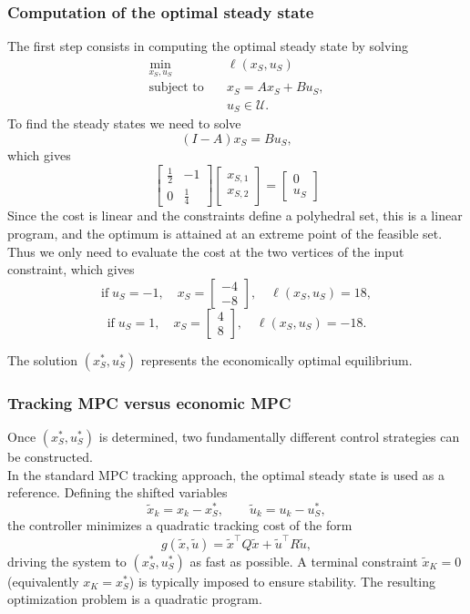 \subsubsection{Computation of the optimal steady state}
The first step consists in computing the optimal steady state by solving
\[
\begin{aligned}
\min_{x_S,u_S} \quad & \ell(x_S,u_S) \\
\text{subject to} \quad & x_S = A x_S + B u_S, \\
& u_S \in \mathcal{U}.
\end{aligned}
\]
To find the steady states we need to solve
\[
(I - A )x_S = B u_S,
\]
which gives
\[
\begin{bmatrix}
    \frac{1}{2} & -1 \\
    0 & \frac{1}{4}
\end{bmatrix}
\begin{bmatrix}
x_{S,1} \\ x_{S,2}
\end{bmatrix}
= \begin{bmatrix}0 \\ u_S
\end{bmatrix}
\]
Since the cost is linear and the constraints define a polyhedral set, this is a linear program, and the optimum is attained at an extreme point of the feasible set. Thus we only need to evaluate the cost at the two vertices of the input constraint, which gives
$$\text{if}\; u_S = -1, \quad x_S = \begin{bmatrix} -4 \\ -8 \end{bmatrix}, \quad \ell(x_S,u_S) = 18,$$
$$\text{if}\; u_S = 1, \quad x_S = \begin{bmatrix} 4 \\ 8 \end{bmatrix}, \quad \ell(x_S,u_S) =- 18.$$

The solution $(x_S^*,u_S^*)$ represents the economically optimal equilibrium.
\subsubsection{Tracking MPC versus economic MPC}
Once $(x_S^*,u_S^*)$ is determined, two fundamentally different control strategies can be constructed.\\

In the standard MPC tracking approach, the optimal steady state is used as a reference. Defining the shifted variables
\[
\tilde{x}_k = x_k - x_S^*, \qquad \tilde{u}_k = u_k - u_S^*,
\]
the controller minimizes a quadratic tracking cost of the form
\[
g(\tilde{x},\tilde{u}) = \tilde{x}^\top Q \tilde{x} + \tilde{u}^\top R \tilde{u},
\]
driving the system to $(x_S^*,u_S^*)$ as fast as possible. A terminal constraint $\tilde{x}_K = 0$ (equivalently $x_K = x_S^*$) is typically imposed to ensure stability. The resulting optimization problem is a quadratic program.\\

